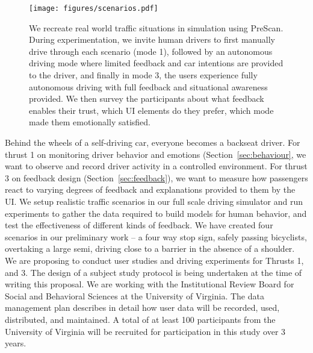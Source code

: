 \begin{figure}
    \centering
    \texttt{[image: figures/scenarios.pdf]}
    \caption{ We recreate real world traffic situations in simulation using PreScan. During experimentation, we invite human drivers to first manually drive through each scenario (mode 1), followed by an autonomous driving mode where limited feedback and car intentions are provided to the driver, and finally in mode 3, the users experience fully autonomous driving with full feedback and situational awareness provided. We then survey the participants about what feedback enables their trust, which UI elements do they prefer, which mode made them emotionally satisfied.  }
    \label{fig:scenario}
\end{figure}

Behind the wheels of a self-driving car, everyone becomes a backseat driver. For thrust 1 on monitoring driver behavior and emotions (Section~\ref{sec:behaviour}, we want to observe and record driver activity in a controlled environment. 
For thrust 3 on feedback design (Section~\ref{sec:feedback}), we want to measure how passengers react to varying degrees of feedback and explanations provided to them by the UI. 
We setup realistic traffic scenarios in our full scale driving simulator and run experiments to gather the data required to build models for human behavior, and test the effectiveness of different kinds of feedback. 
We have created four scenarios in our preliminary work – a four way stop sign, safely passing bicyclists, overtaking a large semi, driving close to a barrier in the absence of a shoulder.
\newline
{}
We are proposing to conduct user studies and driving experiments for Thrusts 1, and 3.
The design of a subject study protocol is being undertaken at the time of writing this proposal. 
We are working with the Institutional Review Board for Social and Behavioral Sciences at the University of Virginia. 
The data management plan describes in detail how user data will be recorded, used, distributed, and maintained. 
A total of at least 100 participants from the University of Virginia will be recruited for participation in this study over 3 years. 
\newline
